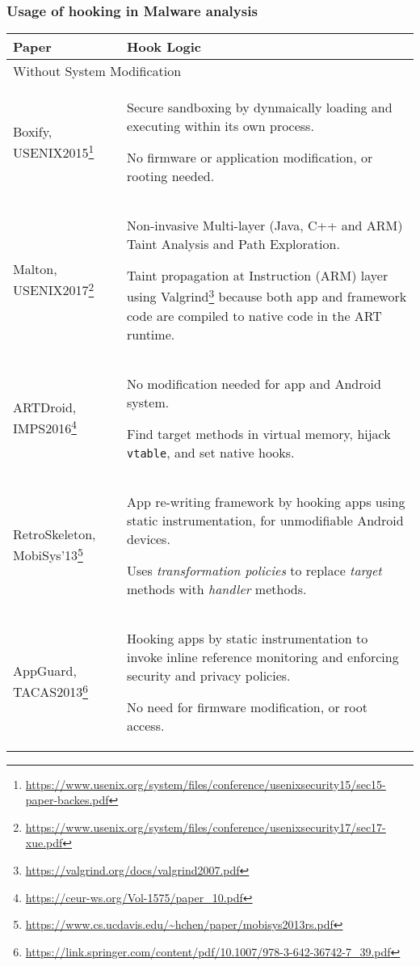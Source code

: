 \subsubsection{Usage of hooking in Malware analysis}
\begin{longtable}{p{.3\linewidth}p{.7\linewidth}} 
\toprule
Paper & Hook Logic  \\
\midrule
\endhead
\multicolumn{2}{l}{Without System Modification}\\
\midrule

Boxify, USENIX2015\footnote{\url{https://www.usenix.org/system/files/conference/usenixsecurity15/sec15-paper-backes.pdf}}
& Secure sandboxing by dynmaically loading and executing within its own process.

No firmware or application modification, or rooting needed.
\\

Malton, USENIX2017\footnote{\url{https://www.usenix.org/system/files/conference/usenixsecurity17/sec17-xue.pdf}}
& Non-invasive Multi-layer (Java, C++ and ARM) Taint Analysis and Path Exploration. 

Taint propagation at Instruction (ARM) layer using Valgrind\footnote{\url{https://valgrind.org/docs/valgrind2007.pdf}} because both app and framework code are compiled to native code in the ART runtime.
\\

ARTDroid, IMPS2016\footnote{\url{https://ceur-ws.org/Vol-1575/paper_10.pdf}}
& No modification needed for app and Android system.

Find target methods in virtual memory, hijack \texttt{vtable}, and set native hooks.
\\

RetroSkeleton, MobiSys'13\footnote{\url{https://www.cs.ucdavis.edu/~hchen/paper/mobisys2013rs.pdf}}
& App re-writing framework by hooking apps using static instrumentation, for unmodifiable Android devices.

Uses \textit{transformation policies} to replace \textit{target} methods with \textit{handler} methods.
\\

AppGuard, TACAS2013\footnote{\url{https://link.springer.com/content/pdf/10.1007/978-3-642-36742-7_39.pdf}}
& Hooking apps by static instrumentation to invoke inline reference monitoring and enforcing security and privacy policies.

No need for firmware modification, or root access.
\\


\end{longtable}
